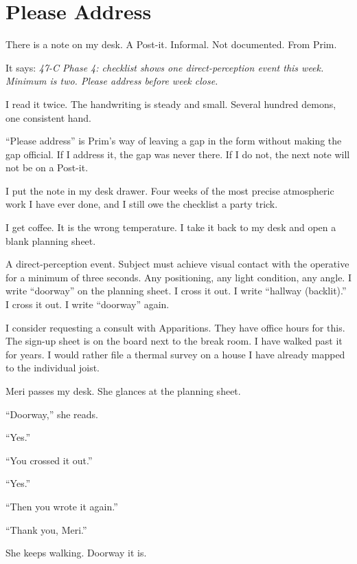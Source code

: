 
\chapter{Please Address}

There is a note on my desk. A Post-it. Informal. Not documented. From Prim.

It says: \emph{47-C Phase 4: checklist shows one direct-perception event this week. Minimum is two. Please address before week close.}

I read it twice. The handwriting is steady and small. Several hundred demons, one consistent hand.

``Please address'' is Prim's way of leaving a gap in the form without making the gap official. If I address it, the gap was never there. If I do not, the next note will not be on a Post-it.

I put the note in my desk drawer. Four weeks of the most precise atmospheric work I have ever done, and I still owe the checklist a party trick.

I get coffee. It is the wrong temperature. I take it back to my desk and open a blank planning sheet.

A direct-perception event. Subject must achieve visual contact with the operative for a minimum of three seconds. Any positioning, any light condition, any angle. I write ``doorway'' on the planning sheet. I cross it out. I write ``hallway (backlit).'' I cross it out. I write ``doorway'' again.

I consider requesting a consult with Apparitions. They have office hours for this. The sign-up sheet is on the board next to the break room. I have walked past it for years. I would rather file a thermal survey on a house I have already mapped to the individual joist.

Meri passes my desk. She glances at the planning sheet.

``Doorway,'' she reads.

``Yes.''

``You crossed it out.''

``Yes.''

``Then you wrote it again.''

``Thank you, Meri.''

She keeps walking. Doorway it is.
